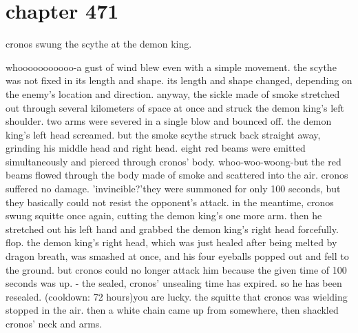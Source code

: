 \section{chapter 471}

cronos swung the scythe at the demon king.





whooooooooooo-a gust of wind blew even with a simple movement.
the scythe was not fixed in its length and shape.
 its length and shape changed, depending on the enemy's location and direction.
 anyway, the sickle made of smoke stretched out through several kilometers of space at once and struck the demon king's left shoulder.
two arms were severed in a single blow and bounced off.
the demon king's left head screamed.
 but the smoke scythe struck back straight away, grinding his middle head and right head.
 eight red beams were emitted simultaneously and pierced through cronos' body.
whoo-woo-woong-but the red beams flowed through the body made of smoke and scattered into the air.
 cronos suffered no damage.
'invincible?'they were summoned for only 100 seconds, but they basically could not resist the opponent's attack.
in the meantime, cronos swung squitte once again, cutting the demon king's one more arm.
 then he stretched out his left hand and grabbed the demon king's right head forcefully.
flop.
 the demon king's right head, which was just healed after being melted by dragon breath, was smashed at once, and his four eyeballs popped out and fell to the ground.
 but cronos could no longer attack him because the given time of 100 seconds was up.
- the sealed, cronos' unsealing time has expired.
 so he has been resealed.
 (cooldown: 72 hours)you are lucky.
the squitte that cronos was wielding stopped in the air.
 then a white chain came up from somewhere, then shackled cronos' neck and arms.

